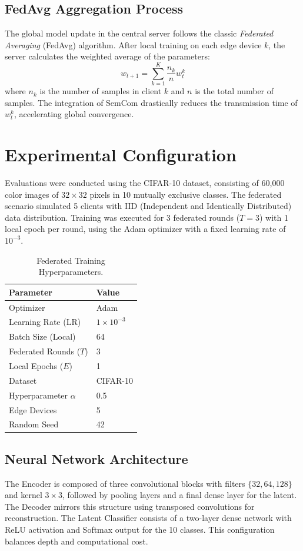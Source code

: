 \documentclass[conference,twocolumn]{IEEEtran}
\begin{document}
\subsection{FedAvg Aggregation Process}
The global model update in the central server follows the classic \textit{Federated Averaging} (FedAvg) algorithm. After local training on each edge device $k$, the server calculates the weighted average of the parameters:
\begin{equation}
    w_{t+1} = \sum_{k=1}^{K} \frac{n_k}{n} w_{t}^k
\end{equation}
where $n_k$ is the number of samples in client $k$ and $n$ is the total number of samples. The integration of SemCom drastically reduces the transmission time of $w_t^k$, accelerating global convergence.

\section{Experimental Configuration}

Evaluations were conducted using the CIFAR-10 dataset, consisting of 60,000 color images of $32 \times 32$ pixels in 10 mutually exclusive classes. The federated scenario simulated 5 clients with IID (Independent and Identically Distributed) data distribution. Training was executed for 3 federated rounds ($T=3$) with 1 local epoch per round, using the Adam optimizer with a fixed learning rate of $10^{-3}$.

\begin{table}[ht]
\centering
\caption{Federated Training Hyperparameters.}
\label{tab:params}
\begin{tabular}{ll}
\toprule
\textbf{Parameter} & \textbf{Value} \\
\midrule
Optimizer & Adam \\
Learning Rate (LR) & $1 \times 10^{-3}$ \\
Batch Size (Local) & 64 \\
Federated Rounds ($T$) & 3 \\
Local Epochs ($E$) & 1 \\
Dataset & CIFAR-10 \\
Hyperparameter $\alpha$ & 0.5 \\
Edge Devices & 5 \\
Random Seed & 42 \\
\bottomrule
\end{tabular}
\end{table}

\subsection{Neural Network Architecture}
The Encoder is composed of three convolutional blocks with filters $\{32, 64, 128\}$ and kernel $3 \times 3$, followed by pooling layers and a final dense layer for the latent. The Decoder mirrors this structure using transposed convolutions for reconstruction. The Latent Classifier consists of a two-layer dense network with ReLU activation and Softmax output for the 10 classes. This configuration balances depth and computational cost.
\end{document}
